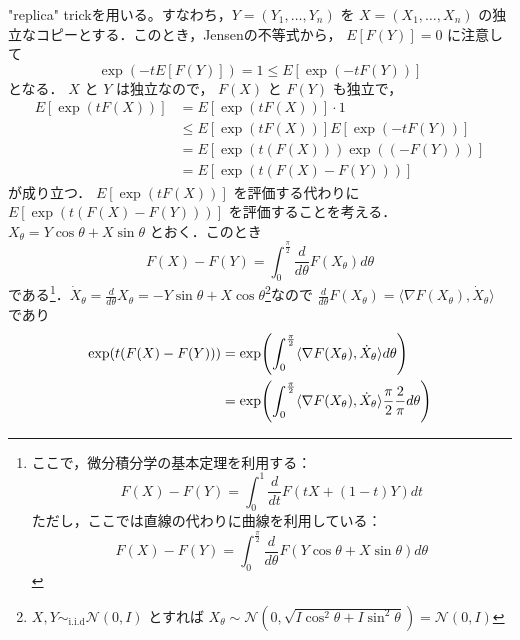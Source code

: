 \documentclass{ltjsarticle}
\makeatletter
\theoremstyle{mystyle1}
\theoremstyle{mystyle2}
\theoremstyle{mystyle3}
\renewenvironment{proof}[1][\proofname]{\par
  \pushQED{\qed}%
  \normalfont
  \topsep6\p@\@plus6\p@ \trivlist
  \item[\hskip\labelsep{\bfseries\sffamily #1}]\ignorespaces
}{%
  \popQED\endtrivlist\@endpefalse
}
\renewcommand\proofname{証明}
\makeatother
\begin{document}
\begin{proof}
    "replica" trickを用いる。すなわち，$Y=(Y_1,\ldots,Y_n)$ を $X=(X_1,\ldots,X_n)$ の独立なコピーとする．このとき，Jensenの不等式から， $E[F(Y)]=0$ に注意して
    \begin{equation}
        \exp(-tE[F(Y)])=1\leq E[\exp(-tF(Y))]
    \end{equation}
    となる． $X$ と $Y$ は独立なので， $F(X)$ と $F(Y)$ も独立で，
    \begin{equation}
        \begin{split}
            E[\exp(tF(X))]
            & =E[\exp(tF(X))]\cdot 1             \\
            & \leq E[\exp(tF(X))]E[\exp(-tF(Y))] \\
            & = E[\exp(t(F(X)))\exp((-F(Y)))]    \\
            & = E[\exp(t(F(X)-F(Y)))]
        \end{split}
    \end{equation}
    が成り立つ． $E[\exp(tF(X))]$ を評価する代わりに $E[\exp(t(F(X)-F(Y)))]$ を評価することを考える．$X_\theta=Y\cos\theta+X\sin\theta$ とおく．このとき
    \begin{equation}
        F(X)-F(Y)=\int_0^{\frac{\pi}{2}}\frac{d}{d\theta}F(X_\theta)d\theta
    \end{equation}
    である\footnote{
        ここで，微分積分学の基本定理を利用する：
        \begin{equation}
            F(X)-F(Y)=\int_0^1\frac{d}{dt}F(tX+(1-t)Y)dt
        \end{equation}
        ただし，ここでは直線の代わりに曲線を利用している：
        \begin{equation}
            F(X)-F(Y)=\int_0^{\frac{\pi}{2}}\frac{d}{d\theta}F(Y\cos\theta +X\sin\theta )d\theta
        \end{equation}
    }．$\dot{X}_\theta=\frac{d}{d\theta}X_\theta=-Y\sin\theta+X\cos\theta$\footnote{
        $X,Y\sim_{\textrm{i.i.d}}\mathcal{N}(0,I)$ とすれば $X_\theta\sim\mathcal{N}(0,\sqrt{I\cos^2\theta+I\sin^2\theta})=\mathcal{N}(0,I)$
    }なので $\frac{d}{d\theta}F(X_\theta)=\langle\nabla F(X_\theta),\dot{X}_\theta\rangle$ であり
    \begin{equation}
        \begin{split}
            \exp(t(F(X)-F(Y)))
            & =\exp\mleft(\int_0^{\frac{\pi}{2}}\langle\nabla  F(X_\theta),\dot{X}_\theta\rangle d\theta\mright)                             \\
            & =\exp\mleft(\int_0^{\frac{\pi}{2}}\langle\nabla F(X_\theta),\dot{X}_\theta\rangle \frac{\pi}{2}\frac{2}{\pi}d\theta\mright)    \\

\end{split}
\end{equation}
\end{proof}
\end{document}
